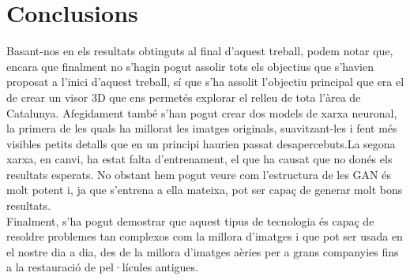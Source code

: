 ﻿\documentclass[10pt,a4paper,twocolumn,twoside]{article}
\begin{document}
\section{Conclusions}
Basant-nos en els resultats obtinguts al final d'aquest treball, podem notar que, encara que finalment no s'hagin pogut assolir tots els objectius que s'havien proposat a l'inici d'aquest treball, sí que s'ha assolit l'objectiu principal que era el de crear un visor 3D que ens permetés explorar el relleu de tota l'àrea de Catalunya. Afegidament també s'han pogut crear dos models de xarxa neuronal, la primera de les quals ha millorat les imatges originals, suavitzant-les i fent més visibles petits detalls que en un principi haurien passat desapercebuts.La segona xarxa, en canvi, ha estat falta d'entrenament, el que ha causat que no donés els resultats esperats. No obstant hem pogut veure com l'estructura de les GAN és molt potent i, ja que s'entrena a ella mateixa, pot ser capaç de generar molt bons resultats.\\
Finalment, s'ha pogut demostrar que aquest tipus de tecnologia és capaç de resoldre problemes tan complexos com la millora d'imatges i que pot ser usada en el nostre dia a dia, des de la millora d'imatges aèries per a grans companyies fins a la restauració de pel·lícules antigues.
\end{document}
